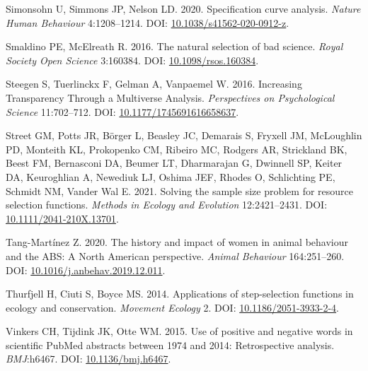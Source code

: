 \documentclass[10pt,a4paper]{article}
\newlength{\cslhangindent}
\newlength{\cslentryspacingunit} %
\newenvironment{CSLReferences}[2] %
 {%
  \setlength{\parindent}{0pt}
  \ifodd #1
  \let\oldpar\par
  \def\par{\hangindent=\cslhangindent\oldpar}
  \fi
  \setlength{\parskip}{#2\cslentryspacingunit}
 }%
 {}
\begin{document}
\begin{CSLReferences}{1}{0}
\leavevmode{}%
Simonsohn U, Simmons JP, Nelson LD. 2020. Specification curve analysis. \emph{Nature Human Behaviour} 4:1208--1214. DOI: \href{https://doi.org/10.1038/s41562-020-0912-z}{10.1038/s41562-020-0912-z}.

\leavevmode{}%
Smaldino PE, McElreath R. 2016. The natural selection of bad science. \emph{Royal Society Open Science} 3:160384. DOI: \href{https://doi.org/10.1098/rsos.160384}{10.1098/rsos.160384}.

\leavevmode{}%
Steegen S, Tuerlinckx F, Gelman A, Vanpaemel W. 2016. Increasing {Transparency} {Through} a {Multiverse} {Analysis}. \emph{Perspectives on Psychological Science} 11:702--712. DOI: \href{https://doi.org/10.1177/1745691616658637}{10.1177/1745691616658637}.

\leavevmode{}%
Street GM, Potts JR, Börger L, Beasley JC, Demarais S, Fryxell JM, McLoughlin PD, Monteith KL, Prokopenko CM, Ribeiro MC, Rodgers AR, Strickland BK, Beest FM, Bernasconi DA, Beumer LT, Dharmarajan G, Dwinnell SP, Keiter DA, Keuroghlian A, Newediuk LJ, Oshima JEF, Rhodes O, Schlichting PE, Schmidt NM, Vander Wal E. 2021. Solving the sample size problem for resource selection functions. \emph{Methods in Ecology and Evolution} 12:2421--2431. DOI: \href{https://doi.org/10.1111/2041-210X.13701}{10.1111/2041-210X.13701}.

\leavevmode{}%
Tang-Martínez Z. 2020. The history and impact of women in animal behaviour and the {ABS}: A {North} {American} perspective. \emph{Animal Behaviour} 164:251--260. DOI: \href{https://doi.org/10.1016/j.anbehav.2019.12.011}{10.1016/j.anbehav.2019.12.011}.

\leavevmode{}%
Thurfjell H, Ciuti S, Boyce MS. 2014. Applications of step-selection functions in ecology and conservation. \emph{Movement Ecology} 2. DOI: \href{https://doi.org/10.1186/2051-3933-2-4}{10.1186/2051-3933-2-4}.

\leavevmode{}%
Vinkers CH, Tijdink JK, Otte WM. 2015. Use of positive and negative words in scientific {PubMed} abstracts between 1974 and 2014: Retrospective analysis. \emph{BMJ}:h6467. DOI: \href{https://doi.org/10.1136/bmj.h6467}{10.1136/bmj.h6467}.


\end{CSLReferences}
\end{document}
